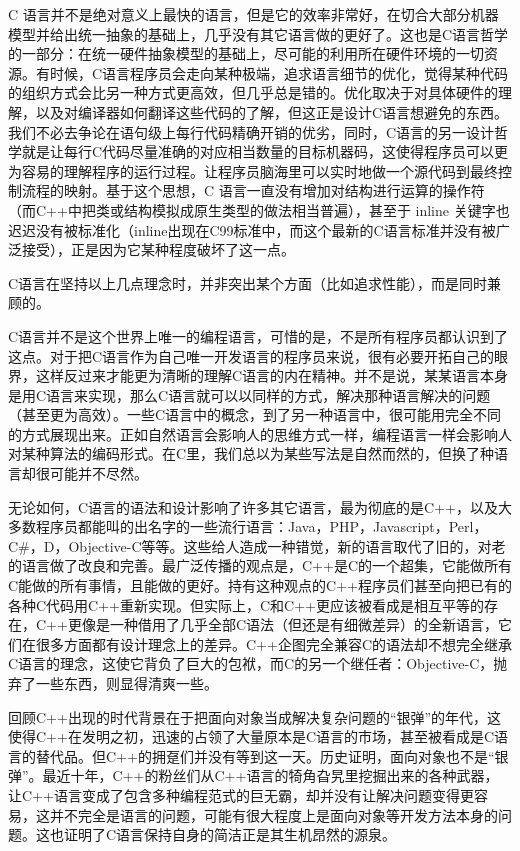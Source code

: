 C 语言并不是绝对意义上最快的语言，但是它的效率非常好，在切合大部分机器模型并给出统一抽象的基础上，几乎没有其它语言做的更好了。这也是C语言哲学的一部分：在统一硬件抽象模型的基础上，尽可能的利用所在硬件环境的一切资源。有时候，C语言程序员会走向某种极端，追求语言细节的优化，觉得某种代码的组织方式会比另一种方式更高效，但几乎总是错的。优化取决于对具体硬件的理解，以及对编译器如何翻译这些代码的了解，但这正是设计C语言想避免的东西。我们不必去争论在语句级上每行代码精确开销的优劣，同时，C语言的另一设计哲学就是让每行C代码尽量准确的对应相当数量的目标机器码，这使得程序员可以更为容易的理解程序的运行过程。让程序员脑海里可以实时地做一个源代码到最终控制流程的映射。基于这个思想，C 语言一直没有增加对结构进行运算的操作符（而C++中把类或结构模拟成原生类型的做法相当普遍），甚至于 inline 关键字也迟迟没有被标准化（inline出现在C99标准中，而这个最新的C语言标准并没有被广泛接受），正是因为它某种程度破坏了这一点。

C语言在坚持以上几点理念时，并非突出某个方面（比如追求性能），而是同时兼顾的。

C语言并不是这个世界上唯一的编程语言，可惜的是，不是所有程序员都认识到了这点。对于把C语言作为自己唯一开发语言的程序员来说，很有必要开拓自己的眼界，这样反过来才能更为清晰的理解C语言的内在精神。并不是说，某某语言本身是用C语言来实现，那么C语言就可以以同样的方式，解决那种语言解决的问题（甚至更为高效）。一些C语言中的概念，到了另一种语言中，很可能用完全不同的方式展现出来。正如自然语言会影响人的思维方式一样，编程语言一样会影响人对某种算法的编码形式。在C里，我们总以为某些写法是自然而然的，但换了种语言却很可能并不尽然。

无论如何，C语言的语法和设计影响了许多其它语言，最为彻底的是C++，以及大多数程序员都能叫的出名字的一些流行语言：Java，PHP，Javascript，Perl，C\#，D，Objective-C等等。这些给人造成一种错觉，新的语言取代了旧的，对老的语言做了改良和完善。最广泛传播的观点是，C++是C的一个超集，它能做所有C能做的所有事情，且能做的更好。持有这种观点的C++程序员们甚至向把已有的各种C代码用C++重新实现。但实际上，C和C++更应该被看成是相互平等的存在，C++更像是一种借用了几乎全部C语法（但还是有细微差异）的全新语言，它们在很多方面都有设计理念上的差异。C++企图完全兼容C的语法却不想完全继承C语言的理念，这使它背负了巨大的包袱，而C的另一个继任者：Objective-C，抛弃了一些东西，则显得清爽一些。

回顾C++出现的时代背景在于把面向对象当成解决复杂问题的“银弹”的年代，这使得C++在发明之初，迅速的占领了大量原本是C语言的市场，甚至被看成是C语言的替代品。但C++的拥趸们并没有等到这一天。历史证明，面向对象也不是“银弹”。最近十年，C++的粉丝们从C++语言的犄角旮旯里挖掘出来的各种武器，让C++语言变成了包含多种编程范式的巨无霸，却并没有让解决问题变得更容易，这并不完全是语言的问题，可能有很大程度上是面向对象等开发方法本身的问题。这也证明了C语言保持自身的简洁正是其生机昂然的源泉。

